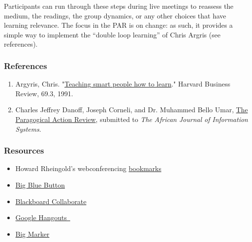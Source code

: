 Participants can run through these steps during live meetings to
reassess the medium, the readings, the group dynamics, or any other
choices that have learning relevance. The focus in the PAR is on change:
as such, it provides a simple way to implement the ``double loop
learning'' of Chris Argris (see references).

\subsubsection{\textbf{References}}

\begin{enumerate}
\item
  Argyris, Chris.
  "\href{http://pds8.egloos.com/pds/200805/20/87/chris\_argyris\_learning.pdf}{Teaching
  smart people how to learn}." Harvard Business Review, 69.3, 1991.
\item
  Charles Jeffrey Danoff, Joseph Corneli, and Dr. Muhammed Bello Umar,
  \href{http://metameso.org/~joe/docs/The-Paragogical-Action-Review.pdf}{The
  Paragogical Action Review}, submitted to \emph{The African Journal of
  Information Systems}.
\end{enumerate}

\subsubsection{\textbf{Resources}}

\begin{itemize}
\item
  Howard Rheingold's webconferencing
  \href{http://delicious.com/hrheingold/webconferencing}{bookmarks}
\item
  \href{http://www.bigbluebutton.org/}{Big Blue Button}
\item
  \href{http://www.blackboard.com/platforms/collaborate/overview.aspx}{Blackboard
  Collaborate}
\item
  \href{http://www.google.com/+/learnmore/hangouts/}{Google Hangouts~}
\item
  \href{http://www.bigmarker.com/about}{Big Marker}
\end{itemize}

